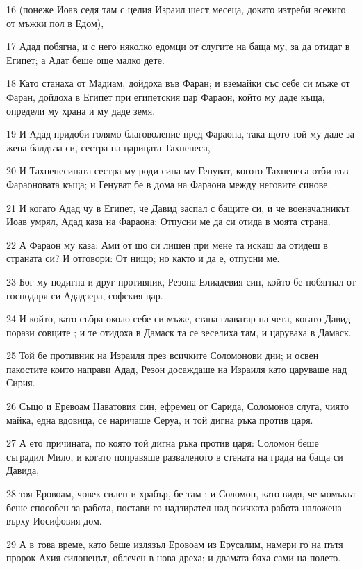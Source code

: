 \par 16 (понеже Иоав седя там с целия Израил шест месеца, докато изтреби всекиго от мъжки пол в Едом),
\par 17 Адад побягна, и с него няколко едомци от слугите на баща му, за да отидат в Египет; а Адат беше още малко дете.
\par 18 Като станаха от Мадиам, дойдоха във Фаран; и вземайки със себе си мъже от Фаран, дойдоха в Египет при египетския цар Фараон, който му даде къща, определи му храна и му даде земя.
\par 19 И Адад придоби голямо благоволение пред Фараона, така щото той му даде за жена балдъза си, сестра на царицата Тахпенеса,
\par 20 И Тахпенесината сестра му роди сина му Генуват, когото Тахпенеса отби във Фараоновата къща; и Генуват бе в дома на Фараона между неговите синове.
\par 21 И когато Адад чу в Египет, че Давид заспал с бащите си, и че военачалникът Иоав умрял, Адад каза на Фараона: Отпусни ме да си отида в моята страна.
\par 22 А Фараон му каза: Ами от що си лишен при мене та искаш да отидеш в страната си? И отговори: От нищо; но както и да е, отпусни ме.
\par 23 Бог му подигна и друг противник, Резона Елиадевия син, който бе побягнал от господаря си Ададзера, софския цар.
\par 24 И който, като събра около себе си мъже, стана главатар на чета, когато Давид порази совците ; и те отидоха в Дамаск та се зеселиха там, и царуваха в Дамаск.
\par 25 Той бе противник на Израиля през всичките Соломонови дни; и освен пакостите които направи Адад, Резон досаждаше на Израиля като царуваше над Сирия.
\par 26 Също и Еревоам Наватовия син, ефремец от Сарида, Соломонов слуга, чиято майка, една вдовица, се наричаше Серуа, и той дигна ръка против царя.
\par 27 А ето причината, по която той дигна ръка против царя: Соломон беше съградил Мило, и когато поправяше разваленото в стената на града на баща си Давида,
\par 28 тоя Еровоам, човек силен и храбър, бе там ; и Соломон, като видя, че момъкът беше способен за работа, постави го надзирател над всичката работа наложена върху Иосифовия дом.
\par 29 А в това време, като беше излязъл Еровоам из Ерусалим, намери го на пътя пророк Ахия силонецът, облечен в нова дреха; и двамата бяха сами на полето.
